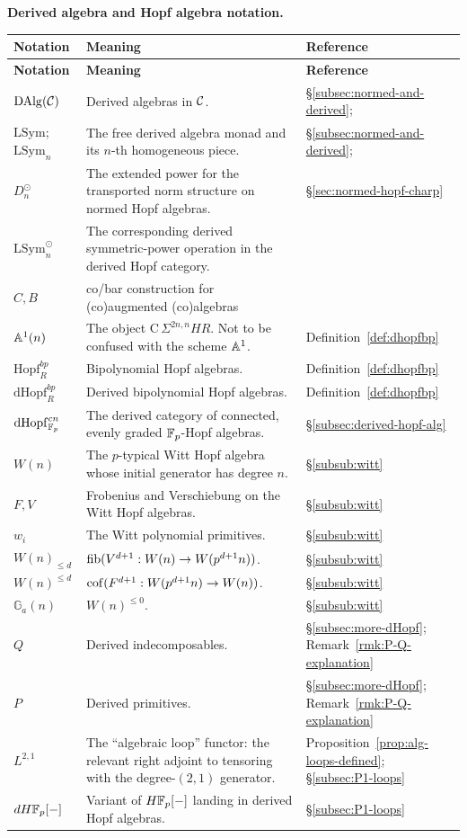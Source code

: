 \documentclass{amsart}
\numberwithin{proposition}{section}
\numberwithin{equation}{section}
\def\LSym{\mathrm{LSym}}
\def\Hopf{\mathrm{Hopf}}
\def\dHopf{\mathrm{dHopf}}
\def\Hopf{\mathrm{Hopf}}
\def\DAlg{\mathrm{DAlg}}
\newcommand{\Ga}{{\mathbb{G}_a}}
\def\Cofree{\mathrm{C}}
\def\dHFp{dH\F_p}
\def\hotimes{\odot}
\def\hLoops{L}
\begin{document}
\medskip
\noindent\textbf{Derived algebra and Hopf algebra notation.}
\begin{longtable}{@{}>{\raggedright\arraybackslash}p{}>{\raggedright\arraybackslash}p{}>{\raggedright\arraybackslash}p{}@{}}
\textbf{Notation} & \textbf{Meaning} & \textbf{Reference} \\
\hline
\endfirsthead
\textbf{Notation} & \textbf{Meaning} & \textbf{Reference} \\
\hline
\endhead
$\DAlg(\scr C)$ & Derived algebras in $\mathcal C$. & \S\ref{subsec:normed-and-derived}; \cite[\S4]{raksit2020hochschild} \\
$\LSym$; $\LSym_n$ & The free derived algebra monad and its $n$-th homogeneous piece. & \S\ref{subsec:normed-and-derived}; \cite[\S4]{raksit2020hochschild} \\
$D_n^\hotimes$ & The extended power for the transported norm structure on normed Hopf algebras. & \S\ref{sec:normed-hopf-charp} \\
$\LSym_n^\hotimes$ & The corresponding derived symmetric-power operation in the derived Hopf category. & \\
$C, B$ & co/bar construction for (co)augmented (co)algebras & \\
$\mathbb A^1(n)$ & The object $\Cofree\,\Sigma^{2n,n}HR$. Not to be confused with the scheme $\mathbb A^1$. & Definition~\ref{def:dhopfbp} \\
$\Hopf_R^{bp}$ & Bipolynomial Hopf algebras. & Definition~\ref{def:dhopfbp} \\
$\dHopf_R^{bp}$ & Derived bipolynomial Hopf algebras. & Definition~\ref{def:dhopfbp} \\
$\dHopf_{\F_p}^{cn}$ & The derived category of connected, evenly graded $\mathbb{F}_p$-Hopf algebras. & \S\ref{subsec:derived-hopf-alg} \\
$W(n)$ & The $p$-typical Witt Hopf algebra whose initial generator has degree $n$. & \S\ref{subsub:witt} \\
$F,V$ & Frobenius and Verschiebung on the Witt Hopf algebras. & \S\ref{subsub:witt} \\
$w_i$ & The Witt polynomial primitives. & \S\ref{subsub:witt} \\
$W(n)_{\le d}$ & $\mathrm{fib}(V^{d+1}:W(n)\to W(p^{d+1}n))$. & \S\ref{subsub:witt} \\
$W(n)^{\le d}$ & $\operatorname{cof}(F^{d+1}:W(p^{d+1}n)\to W(n))$. & \S\ref{subsub:witt} \\
$\Ga(n)$ & $W(n)^{\le0}$. & \S\ref{subsub:witt} \\
$Q$ & Derived indecomposables. & \S\ref{subsec:more-dHopf}; Remark~\ref{rmk:P-Q-explanation} \\
$P$ & Derived primitives. & \S\ref{subsec:more-dHopf}; Remark~\ref{rmk:P-Q-explanation} \\
$\hLoops^{2,1}$ & The ``algebraic loop'' functor: the relevant right adjoint to tensoring with the degree-$(2,1)$ generator. & Proposition~\ref{prop:alg-loops-defined}; \S\ref{subsec:P1-loops} \\
$\dHFp[\ph]$ & Variant of $H\mathbb{F}_p[\mathord-]$ landing in derived Hopf algebras. & \S\ref{subsec:P1-loops} \\
\end{longtable}
\renewcommand{\arraystretch}{1}
\end{document}
